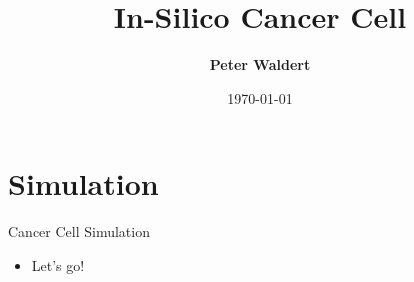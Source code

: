 \documentclass[table, aspectratio=169]{beamer}
\title[IVC Seminar SS2025]{In-Silico Cancer Cell}
\author[Peter Waldert]{\textbf{Peter Waldert}}
\date{\today}
\institute{IVC}
\begin{document}
  \begin{frame}[plain]
    \maketitle
  \end{frame}

  \section{Simulation}
  \begin{frame}{Cancer Cell Simulation}
    \begin{itemize}
      \item Let's go!
    \end{itemize}
  \end{frame}
\end{document}
